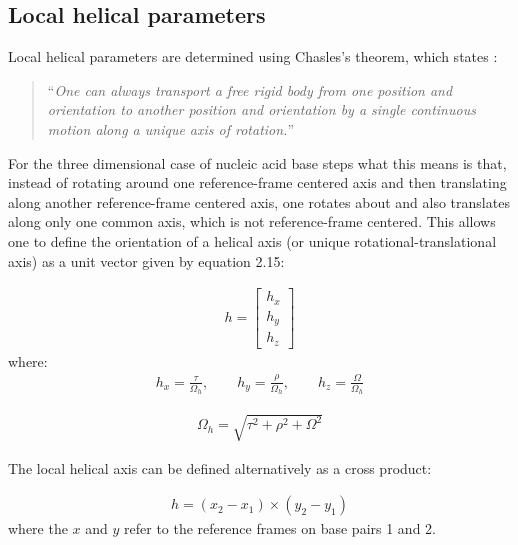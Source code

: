 \subsection{Local helical parameters}

Local helical parameters are determined using Chasles's theorem, which
states \cite{babcock1994}:
\begin{quote}
``\textit{One can  always transport  a free rigid  body from one  position and
  orientation  to  another  position   and  orientation  by  a  single
  continuous motion along a unique axis of rotation.}''
\end{quote}

\noindent For  the three dimensional  case of nucleic acid  base steps
what   this  means   is   that,  instead   of   rotating  around   one
reference-frame  centered  axis  and  then translating  along  another
reference-frame centered  axis, one rotates about  and also translates
along   only   one  common   axis,   which   is  not   reference-frame
centered. This allows one to  define the orientation of a helical axis
(or unique  rotational-translational axis) as  a unit vector  given by
equation 2.15:

\begin{gather}
h=\left[ \begin{array}{c}
h_x\\
h_y\\
h_z
\end{array} \right]
\end{gather}
where:
\begin{gather}
h_x = \frac{\tau}{\Omega_h}, \qquad h_y = \frac{\rho}{\Omega_h},
\qquad h_z = \frac{\Omega}{\Omega_h}
\end{gather}

\begin{gather}
\Omega_h = \sqrt{\tau^2 + \rho^2 + \Omega^2}
\end{gather}

The local helical axis can be defined alternatively \cite{bansal1995}
as a cross product:

\begin{gather}
h = (x_2 - x_1) \times (y_2 - y_1)
\end{gather}
where the  $x$ and $y$ refer to  the reference frames on  base pairs 1
and 2.

